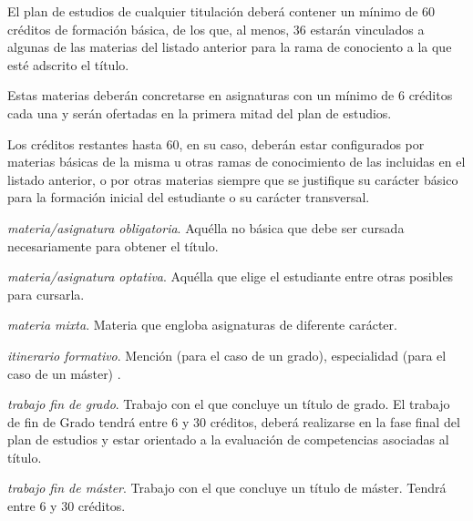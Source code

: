         El plan de estudios de cualquier titulación deberá contener un mínimo de
        60 créditos de formación básica, de los que, al menos, 36
        estarán vinculados a algunas de las materias del listado anterior
        para la rama de conociento a la que esté adscrito el título\cite[artículo 12,
        apartado 5]{rd1393}.

        Estas materias deberán concretarse en asignaturas con un mínimo
        de 6 créditos cada una y serán ofertadas en la primera
        mitad del plan de estudios.

        Los créditos restantes hasta 60, en su caso, deberán estar configurados por
        materias básicas de la misma u otras ramas de conocimiento de las incluidas en
        el listado anterior, o por otras materias siempre que se justifique su carácter
        básico para la formación inicial del estudiante o su carácter transversal.

    \item \emph{materia/asignatura obligatoria}. Aquélla no básica que debe ser cursada
        necesariamente para obtener el título\cite[sección
        D.5]{guiaMadridMasD}\cite[artículo 12, apartado 2]{rd1393}.

    \item \emph{materia/asignatura optativa}. Aquélla que elige el estudiante entre
        otras posibles para cursarla\cite[sección
        D.5]{guiaMadridMasD}\cite[artículo 12, apartado 2]{rd1393}.

    \item \emph{materia mixta}. Materia que engloba asignaturas de diferente
        carácter\cite[sección D.5]{guiaMadridMasD}\cite[artículo 12, apartado 
        2]{rd1393}. 

    \item \emph{itinerario formativo}. Mención (para el caso de un grado),
        especialidad (para el caso de un máster) \cite[sección
        D.4]{guiaMadridMasD}\cite[artículo 9, apartado 3]{rd1393}.

    \item \emph{trabajo fin de grado}. Trabajo con el que concluye un título de
        grado\cite[artículo 12, apartado 3]{rd1393}. El trabajo de fin de Grado
        tendrá entre 6 y 30 créditos, deberá realizarse en la fase final del
        plan de estudios y estar orientado a la evaluación de competencias
        asociadas al título.\cite[artículo 12, apartado 7]{rd1393}

    \item \emph{trabajo fin de máster}. Trabajo con el que concluye un título
        de máster\cite[artículo 15, apartado 3]{rd1393}. Tendrá entre 6 y 30 créditos.

